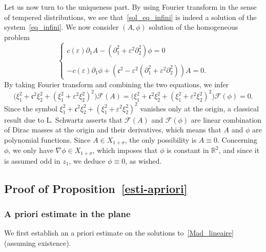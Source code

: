 \documentclass[10pt]{amsart}
\theoremstyle{definition}\newtheorem{defi}[theo]{Definition}\newtheorem{rema}[theo]{Remark}\newtheorem{exam}[theo]{Example}\newtheorem{exem}[theo]{Example}\newtheorem{nota}[theo]{Notation}
\newcommand*\p{\partial}
\newcommand*\R{\mathbb R}
\newcommand*\ds{\displaystyle}
\newcommand*\Fou{\mathscr{F}}
\newcommand*\cs{{\mathfrak c}}
\newcommand*\e{\varepsilon}
\newcommand*\s{\sigma}
\begin{document}
Let us now turn to the uniqueness part. By using Fourier transform in the sense of tempered distributions, we see that~\eqref{sol_eq_infini} is indeed a solution of the system~\eqref{eq_infini}. We now consider $ (A, \phi) $ solution of the homogeneous problem
\begin{equation*}
\left\{
\begin{array}{ll}
\ds{ c(\e) \p_{1} A - \left(\p_{1}^2 + \e^2 \p^2_{2}\right) \phi = 0 }\\ \ \\
\ds{ - c(\e) \p_{1} \phi + \left(\cs^2 - \e^2\left(\p_{1}^2 + \e^2 \p_{2}^2\right)\right) A = 0.}
\end{array}\right.
\end{equation*}
By taking Fourier transform and combining the two equations, we infer
\[
\Big(\xi_1^2 + \cs^2 \xi_2^2 + \left(\xi_1^2 + \e^2 \xi_2^2\right)^2 \Big) \Fou(A) = \Big(\xi_1^2 + \cs^2 \xi_2^2 + \left(\xi_1^2 + \e^2 \xi_2^2\right)^2 \Big) \Fou(\phi) = 0.
\]
Since the symbol $ \xi_1^2 + \cs^2 \xi_2^2 + (\xi_1^2 + \e^2\xi_2^2)^2 $ vanishes only at the origin, a classical result due to L. Schwartz asserts that $ \Fou(A) $ and $ \Fou(\phi) $ are linear combination of Dirac masses at the origin and their derivatives, which means that $ A $ and $ \phi $ are polynomial functions. Since $ A \in X_{1+\s} $, the only possibility is $A \equiv 0 $. Concerning $ \phi $, we only have $ \nabla \phi \in X_{1+\s} $, which imposes that $ \phi $ is constant in $ \R^2 $, and since it is assumed odd in $ z_1 $, we deduce $ \phi \equiv 0 $, as wished.



\subsection{Proof of Proposition~\ref{esti-apriori}}



\subsubsection{A priori estimate in the plane}

We first establish an a priori estimate on the solutions to~\eqref{Mad_lineaire} (assuming existence).
\end{document}

